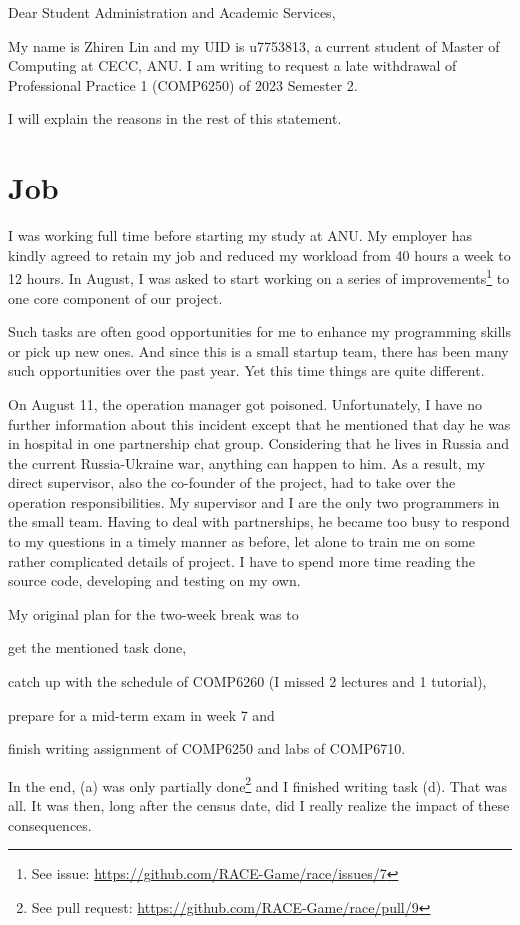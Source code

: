 \documentclass[12pt,a4paper]{article}
\begin{document}
\noindent
Dear Student Administration and Academic Services,

My name is Zhiren Lin and my UID is u7753813, a current student of Master of Computing at CECC, ANU. I am writing to request a late withdrawal of Professional Practice 1 (COMP6250) of 2023 Semester 2.

I will explain the reasons in the rest of this statement.

\section{Job}
I was working full time before starting my study at ANU.  My employer has kindly agreed to retain my job and reduced my workload from 40 hours a week to 12 hours.  In August, I was asked to start working on a series of improvements\footnote{See issue: \url{https://github.com/RACE-Game/race/issues/7}} to one core component of our project.

Such tasks are often good opportunities for me to enhance my programming skills or pick up new ones.  And since this is a small startup team, there has been many such opportunities over the past year. Yet this time things are quite different.

On August 11, the operation manager got poisoned.  Unfortunately, I have no further information about this incident except that he mentioned that day he was in hospital in one partnership chat group.  Considering that he lives in Russia and the current Russia-Ukraine war, anything can happen to him.  As a result, my direct supervisor, also the co-founder of the project, had to take over the operation responsibilities.  My supervisor and I are the only two programmers in the small team.  Having to deal with partnerships, he became too busy to respond to my questions in a timely manner as before, let alone to train me on some rather complicated details of project.  I have to spend more time reading the source code, developing and testing on my own.

My original plan for the two-week break was to
\begin{enumerate*}[label=(\alph*), font=\bfseries]
\item get the mentioned task done,
\item catch up with the schedule of COMP6260 (I missed 2 lectures and 1 tutorial),
\item prepare for a mid-term exam in week 7 and
\item finish writing assignment of COMP6250 and labs of COMP6710.
\end{enumerate*}
In the end, (a) was only partially done\footnote{See pull request: \url{https://github.com/RACE-Game/race/pull/9}} and I finished writing task (d).  That was all.  It was then, long after the census date, did I really realize the impact of these consequences.
\end{document}
